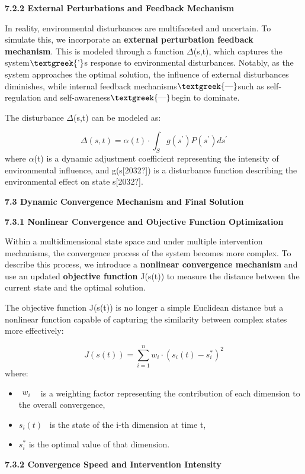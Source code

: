 \documentclass[a4paper]{article}
\begin{document}
\textbf{7.2.2 External Perturbations and Feedback Mechanism}

In reality, environmental disturbances are multifaceted and uncertain. To simulate this, we incorporate an
\textbf{external perturbation feedback mechanism}. This is modeled through a function $\Delta $(s,t), which captures
the system$\text{\textgreek{’}}$s response to environmental disturbances. Notably, as the system approaches the optimal
solution, the influence of external disturbances diminishes, while internal feedback
mechanisms$\text{\textgreek{—}}$such as self-regulation and self-awareness$\text{\textgreek{—}}$begin to dominate.

The disturbance $\Delta $(s,t) can be modeled as:

\begin{equation*}
\Delta \left(s,t\right)=\alpha \left(t\right){\cdot}\int _Sg\left(s^{'}\right)P\left(s^{'}\right)ds^{'}
\end{equation*}
where $\alpha $(t) is a dynamic adjustment coefficient representing the intensity of environmental influence, and
g(s[2032?]) is a disturbance function describing the environmental effect on state s[2032?].

\textbf{7.3 Dynamic Convergence Mechanism and Final Solution}

\textbf{7.3.1 Nonlinear Convergence and Objective Function Optimization}

Within a multidimensional state space and under multiple intervention mechanisms, the convergence process of the system
becomes more complex. To describe this process, we introduce a \textbf{nonlinear convergence mechanism} and use an
updated \textbf{objective function} J(s(t)) to measure the distance between the current state and the optimal solution.

The objective function J(s(t)) is no longer a simple Euclidean distance but a nonlinear function capable of capturing
the similarity between complex states more effectively:

\begin{equation*}
J\left(s\left(t\right)\right)=\sum _{i=1}^nw_i{\cdot}\left(s_i\left(t\right)-s_i^{\ast }\right)^2
\end{equation*}
where:

\begin{itemize}[series=listWWNumxvii,label=[F0B7?]]
\item  $\begin{matrix}w_i\end{matrix}$ \ is a weighting factor representing the contribution of each dimension to the
overall convergence,
\item  $s_i\left(t\right)$ \ is the state of the i-th dimension at time t,
\item  $s_i^{\ast }$\hspace{0pt} is the optimal value of that dimension.
\end{itemize}
\textbf{7.3.2 Convergence Speed and Intervention Intensity}
\end{document}

